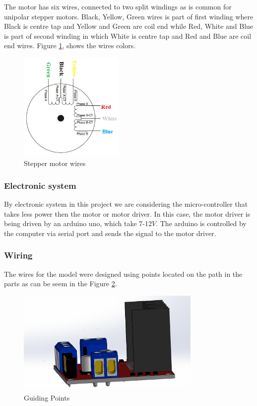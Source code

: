 \documentclass[transmag]{IEEEtran}
\begin{document}
The motor has six wires, connected to two split windings as is common for unipolar stepper motors. Black, Yellow, Green wires is part of first winding where Black is centre tap and Yellow and Green are coil end while Red, White and Blue is part of second winding in which White is centre tap and Red and Blue are coil end wires. Figure \ref{ASS4-Stepper2}, shows the wires colors. \cite{ref7}

\begin{figure}[H]
\centerline{\includegraphics[width=2in]{./images/ASS4-Stepper2}}
\caption{Stepper motor wires\label{ASS4-Stepper2}}
\end{figure}

\subsubsection{Electronic system}

By electronic system in this project we are considering the micro-controller that takes less power then the motor or motor driver. In this case, the motor driver is being driven by an arduino uno, which take 7-12$V$.
The arduino is controlled by the computer via serial port and sends the signal to the motor driver.

\subsubsection{Wiring}

The wires for the model were designed using points located on the path in the parts as can be seem in the Figure \ref{ASS4-Wiring3}. 

\begin{figure}[H]
\centerline{\includegraphics[width=3.5in]{./images/ASS4-Wiring3}}
\caption{Guiding Points\label{ASS4-Wiring3}}
\end{figure}
\end{document}
